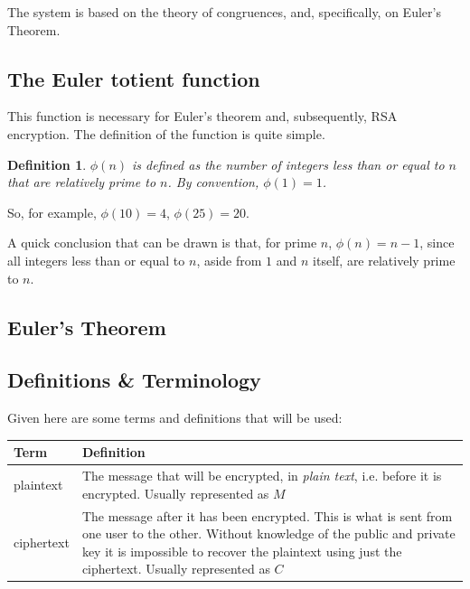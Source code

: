 \documentclass[12pt, titlepage]{article}
\newtheorem*{definition}{Definition}
\begin{document}
The system is based on the theory of congruences, and, specifically, on Euler's Theorem.

    \subsection{The Euler totient function}
    This function is necessary for Euler's theorem and, subsequently, RSA encryption. The
    definition of the function is quite simple.
    \begin{definition}
        $\phi(n)$ is defined as the \emph{number} of integers less than or equal to $n$ that
        are relatively prime to $n$. By convention, $\phi(1) = 1$.
    \end{definition}
    So, for example, $\phi(10) = 4$, $\phi(25) = 20$.

    A quick conclusion that can be drawn is that, for prime $n$, $\phi(n) = n - 1$, since
    all integers less than or equal to $n$, aside from $1$ and $n$ itself, are relatively
    prime to $n$.

    \subsection{Euler's Theorem}
    
    \subsection{Definitions \& Terminology}
    Given here are some terms and definitions that will be used:
    \begin{table}[H]
        \begin{tabular}{ | m{5em} | p{30em} | }
            \hline
            Term      & Definition\\
            \hline
            plaintext & The message that will be encrypted, in \emph{plain
                        text}, i.e. before it is encrypted. Usually represented as $M$\\
            \hline
            ciphertext & The message after it has been encrypted. This is what
                         is sent from one user to the other. Without
                         knowledge of the public and private key it is
                         impossible to recover the plaintext using just the
                         ciphertext. Usually represented as $C$\\
            \hline
        \end{tabular}
    \end{table}
\end{document}
